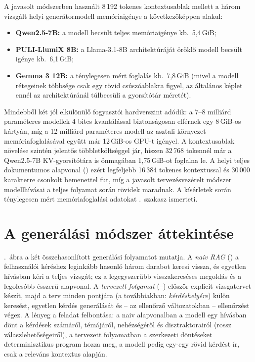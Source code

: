 A javasolt módszerben használt 8\,192 tokenes kontextusablak mellett a három vizsgált helyi generátormodell
memóriaigénye a következőképpen alakul:
\begin{itemize}[leftmargin=*,itemsep=2pt,topsep=3pt]
\item \textbf{Qwen2.5-7B:} a modell becsült teljes memóriaigénye kb.\ 5,4\,GiB;
\item \textbf{PULI-LlumiX 8B:} a Llama-3.1-8B architektúráját öröklő modell becsült igénye kb.\ 6,1\,GiB;
\item \textbf{Gemma 3 12B:} a ténylegesen mért foglalás kb.\ 7,8\,GiB (mivel a modell rétegeinek többsége
csak egy rövid csúszóablakra figyel, az általános képlet ennél az architektúránál túlbecsüli a gyorsítótár
méretét).
\end{itemize}

Mindebből két jól elkülönülő fogyasztói hardverszint adódik: a 7--8 milliárd paraméteres modellek 4 bites
kvantálással biztonságosan elférnek egy 8\,GiB-os kártyán, míg a 12 milliárd paraméteres modell az asztali
környezet memóriafoglalásával együtt már 12\,GiB-os GPU-t igényel. A kontextusablak növelése szintén
jelentős többletköltséggel jár, hiszen 32\,768 tokennél már a Qwen2.5-7B KV-gyorsítótára is önmagában
1,75\,GiB-ot foglalna le. A helyi teljes dokumentumos alapvonal () ezért legfeljebb 16\,384
tokenes kontextussal és 30\,000 karakterre csonkolt bemenettel fut, míg a javasolt tervezésvezérelt módszer
modellhívásai a teljes folyamat során rövidek maradnak. A kísérletek során ténylegesen mért memóriafoglalási
adatokat \az{\ref{sec:fo-eroforras}}.~szakasz ismerteti.

\section{A generálási módszer áttekintése}
\label{sec:attekintes}

\Az{\ref{fig:pipelines}}.~ábra a két összehasonlított generálási folyamatot mutatja. A \emph{naiv RAG}
() a felhasználói kéréshez leginkább hasonló három darabot keresi vissza, és egyetlen hívásban
kéri a teljes vizsgát; ez a legegyszerűbb visszakereséses megoldás és a legolcsóbb ésszerű alapvonal. A
\emph{tervezett folyamat} (--) először explicit vizsgatervet készít, majd a terv minden
pontjára (a továbbiakban: \emph{kérdéshelyére}) külön keresést, egyetlen kérdés generálását és -- az
ellenőrző változatokban -- ellenőrzést végez. A lényeg a feladat felbontása: a naiv alapvonalban a modell
egy hívásban dönt a kérdések számáról, témájáról, nehézségéről és disztraktorairól (rossz
válaszlehetőségeiről), a tervezett folyamatban a szerkezeti döntéseket determinisztikus program hozza
meg, a modell pedig egy-egy rövid kérdést ír, csak a releváns kontextus alapján.

